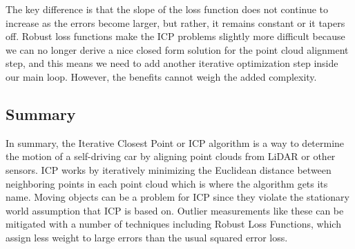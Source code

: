 The key difference is that the slope of the
loss function does not continue to increase as
the errors become larger, but rather, it remains
constant or it tapers off. Robust loss functions make the ICP problems slightly
more difficult because we can no longer derive
a nice closed form solution for the point cloud
alignment step, and this means we need to add another iterative optimization
step inside our main loop. However, the benefits cannot
weigh the added complexity. 

\subsection{Summary}

In summary, the Iterative
Closest Point or ICP algorithm is
a way to determine the motion of
a self-driving car by aligning point clouds from
LiDAR or other sensors. ICP works by iteratively minimizing the Euclidean
distance between neighboring points
in each point cloud which is where the algorithm
gets its name. Moving objects can be
a problem for ICP since they violate the stationary
world assumption that ICP is based on. Outlier measurements like these can be mitigated with a number of techniques including
Robust Loss Functions, which assign less weight to large errors than
the usual squared error loss.

